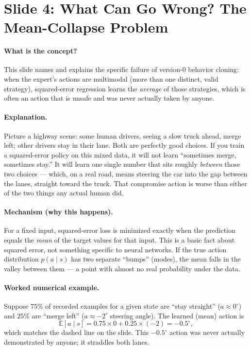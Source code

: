 \documentclass[11pt]{article}
\begin{document}
\section{Slide 4: What Can Go Wrong? The Mean-Collapse Problem}

\paragraph{What is the concept?}
This slide names and explains the specific failure of version-0 behavior cloning: when
the expert's actions are multimodal (more than one distinct, valid strategy), squared-error
regression learns the \emph{average} of those strategies, which is often an action that
is unsafe and was never actually taken by anyone.

\paragraph{Explanation.}
Picture a highway scene: some human drivers, seeing a slow truck ahead, merge left; other
drivers stay in their lane. Both are perfectly good choices. If you train a
squared-error policy on this mixed data, it will not learn ``sometimes merge, sometimes
stay.'' It will learn one single number that sits roughly \emph{between} those two
choices --- which, on a real road, means steering the car into the gap between the lanes,
straight toward the truck. That compromise action is worse than either of the two things
any actual human did.

\paragraph{Mechanism (why this happens).}
For a fixed input, squared-error loss is minimized exactly when the prediction equals
the \emph{mean} of the target values for that input. This is a basic fact about squared
error, not something specific to neural networks. If the true action distribution
$p(a\mid s)$ has two separate ``bumps'' (modes), the mean falls in the valley between
them --- a point with almost no real probability under the data.

\paragraph{Worked numerical example.}
Suppose $75\%$ of recorded examples for a given state are ``stay straight'' ($a\approx
0^\circ$) and $25\%$ are ``merge left'' ($a\approx -2^\circ$ steering angle). The learned
(mean) action is
$$\mathbb{E}[a\mid s] = 0.75\times 0 + 0.25\times(-2) = -0.5^\circ,$$
which matches the dashed line on the slide. This $-0.5^\circ$ action was never actually
demonstrated by anyone; it straddles both lanes.
\end{document}
